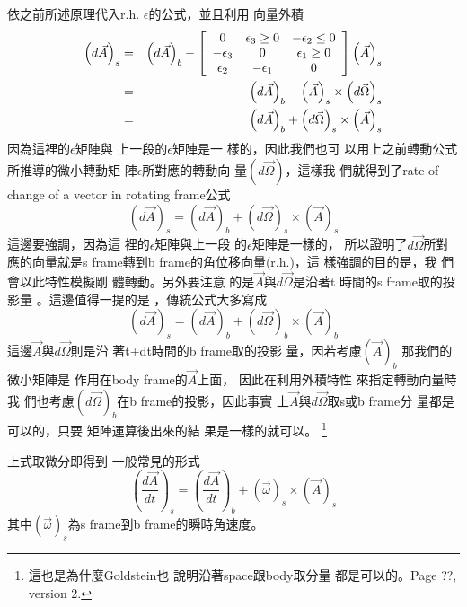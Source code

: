\documentclass[12pt,a4paper]{article}
\begin{document}
依之前所述原理代入r.h. 
$\epsilon $的公式，並且利用%
向量外積%
\begin{eqnarray*}
\left( d\vec{A}\right) _{s} &=&\left( d\vec{A}\right) _{b}-\left[ 
\begin{array}{ccc}
0 & \epsilon _{3}\geq 0 & -\epsilon _{2}\leq 0 \\ 
-\epsilon _{3} & 0 & \epsilon _{1}\geq 0 \\ 
\epsilon _{2} & -\epsilon _{1} & 0%
\end{array}%
\right] \left( \vec{A}\right) _{s} \\
&=&\left( d\vec{A}\right) _{b}-\left( \vec{A}\right) _{s}\times \left( d\vec{%
\Omega}\right) _{s} \\
&=&\left( d\vec{A}\right) _{b}+\left( d\vec{\Omega}\right) _{s}\times \left( 
\vec{A}\right) _{s}
\end{eqnarray*}%
因為這裡的$\epsilon $矩陣與%
上一段的$\epsilon $矩陣是一%
樣的，因此我們也可%
以用上之前轉動公式%
所推導的微小轉動矩%
陣$\epsilon $所對應的轉動向%
量$\left( d\vec{\Omega}\right) $，這樣我%
們就得到了rate of change of a vector in
rotating frame公式%
\begin{equation}
\left( d\vec{A}\right) _{s}=\left( d\vec{A}\right) _{b}+\left( d\vec{\Omega}%
\right) _{s}\times \left( \vec{A}\right) _{s}
\end{equation}%
這邊要強調，因為這%
裡的$\epsilon $矩陣與上一段%
的$\epsilon $矩陣是一樣的，%
所以證明了$d\vec{\Omega}$所對%
應的向量就是s frame轉到b
frame的角位移向量(r.h.)，這%
樣強調的目的是，我%
們會以此特性模擬剛%
體轉動。另外要注意%
的是$\vec{A}$與$d\vec{\Omega}$是沿著t%
時間的s frame取的投影量%
。這邊值得一提的是%
，傳統公式大多寫成%
\begin{equation*}
\left( d\vec{A}\right) _{s}=\left( d\vec{A}\right) _{b}+\left( d\vec{\Omega}%
\right) _{b}\times \left( \vec{A}\right) _{b}
\end{equation*}%
這邊$\vec{A}$與$d\vec{\Omega}$則是沿%
著t+dt時間的b frame取的投影%
量，因若考慮$\left( \vec{A}\right) _{b}$%
那我們的微小矩陣是%
作用在body frame的$\vec{A}$上面，%
因此在利用外積特性%
來指定轉動向量時我%
們也考慮$\left( d\vec{\Omega}\right) _{b}$在b
frame的投影$， $因此事實%
上$\vec{A}$與$d\vec{\Omega}$取s或b frame分%
量都是可以的，只要%
矩陣運算後出來的結%
果是一樣的就可以。%
\footnote{這也是為什麼Goldstein也%
說明沿著space跟body取分量%
都是可以的。Page ??, version 2.}

\bigskip 上式取微分即得到%
一般常見的形式%
\begin{equation}
\left( \frac{d\vec{A}}{dt}\right) _{s}=\left( \frac{d\vec{A}}{dt}\right)
_{b}+\left( \vec{\omega}\right) _{s}\times \left( \vec{A}\right) _{s}
\label{rateofchange}
\end{equation}%
其中$\left( \vec{\omega}\right) _{s}$為s frame到b
frame的瞬時角速度。
\end{document}
